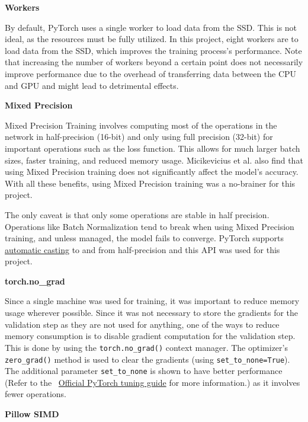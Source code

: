 \documentclass[a4paper,11pt,openright]{book}
\begin{document}
\textbf{Workers}

By default, PyTorch uses a single worker to load data from the SSD. This is not ideal, as the resources must be fully utilized. In this project, eight workers are to load data from the SSD, which improves the training process's performance. Note that increasing the number of workers beyond a certain point does not necessarily improve performance due to the overhead of transferring data between the CPU and GPU and might lead to detrimental effects.

\textbf{Mixed Precision}

Mixed Precision Training \cite{micikeviciusMixedPrecisionTraining2017} involves computing most of the operations in the network in half-precision (16-bit) and only using full precision (32-bit) for important operations such as the loss function. This allows for much larger batch sizes, faster training, and reduced memory usage. Micikevicius et al. also find that using Mixed Precision training does not significantly affect the model's accuracy. With all these benefits, using Mixed Precision training was a no-brainer for this project.

The only caveat is that only some operations are stable in half precision. Operations like Batch Normalization tend to break when using Mixed Precision training, and unless managed, the model fails to converge. PyTorch supports \href{https://pytorch.org/docs/stable/notes/amp_examples.html}{automatic casting} to and from half-precision and this API was used for this project.

\textbf{torch.no\_grad}

Since a single machine was used for training, it was important to reduce memory usage wherever possible. Since it was not necessary to store the gradients for the validation step as they are not used for anything, one of the ways to reduce memory consumption is to disable gradient computation for the validation step. This is done by using the \texttt{torch.no\_grad()} context manager.  The optimizer's \texttt{zero\_grad()} method is used to clear the gradients (using \texttt{set\_to\_none=True}). The additional parameter \texttt{set\_to\_none} is shown to have better performance (Refer to the ~\href{https://pytorch.org/tutorials/recipes/recipes/tuning_guide.html}{Official PyTorch tuning guide} for more information.) as it involves fewer operations.

\textbf{Pillow SIMD}
\end{document}
